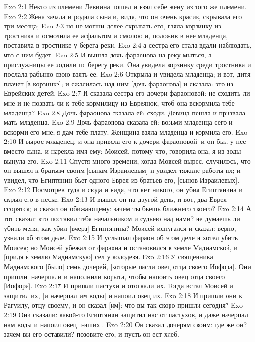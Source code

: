 \vs Exo 2:1 Некто из племени Левиина пошел и взял себе жену из того же племени.
\vs Exo 2:2 Жена зачала и родила сына и, видя, что он очень красив, скрывала его три месяца;
\vs Exo 2:3 но не могши долее скрывать его, взяла корзинку из тростника и осмолила ее асфальтом и смолою и, положив в нее младенца, поставила в тростнике у берега реки,
\vs Exo 2:4 а сестра его стала вдали наблюдать, что с ним будет.
\vs Exo 2:5 И вышла дочь фараонова на реку мыться, а прислужницы ее ходили по берегу реки. Она увидела корзинку среди тростника и послала рабыню свою взять ее.
\vs Exo 2:6 Открыла и увидела младенца; и вот, дитя плачет [в корзинке]; и сжалилась над ним [дочь фараонова] и сказала: это из Еврейских детей.
\vs Exo 2:7 И сказала сестра его дочери фараоновой: не сходить ли мне и не позвать ли к тебе кормилицу из Евреянок, чтоб она вскормила тебе младенца?
\vs Exo 2:8 Дочь фараонова сказала ей: сходи. Девица пошла и призвала мать младенца.
\vs Exo 2:9 Дочь фараонова сказала ей: возьми младенца сего и вскорми его мне; я дам тебе плату. Женщина взяла младенца и кормила его.
\vs Exo 2:10 И вырос младенец, и она привела его к дочери фараоновой, и он был у нее вместо сына, и нарекла имя ему: Моисей, потому что, говорила она, я из воды вынула его.
\rsbpar\vs Exo 2:11 Спустя много времени, когда Моисей вырос, случилось, что он вышел к братьям своим [сынам Израилевым] и увидел тяжкие работы их; и увидел, что Египтянин бьет одного Еврея из братьев его, [сынов Израилевых].
\vs Exo 2:12 Посмотрев туда и сюда и видя, что нет никого, он убил Египтянина и скрыл его в песке.
\vs Exo 2:13 И вышел он на другой день, и вот, два Еврея ссорятся; и сказал он обижающему: зачем ты бьешь ближнего твоего?
\vs Exo 2:14 А тот сказал: кто поставил тебя начальником и судьею над нами? не думаешь ли убить меня, как убил [вчера] Египтянина? Моисей испугался и сказал: верно, узнали об этом деле.
\vs Exo 2:15 И услышал фараон об этом деле и хотел убить Моисея; но Моисей убежал от фараона и остановился в земле Мадиамской, и [придя в землю Мадиамскую] сел у колодезя.
\vs Exo 2:16 У священника Мадиамского [было] семь дочерей, [которые пасли овец отца своего Иофора]. Они пришли, начерпали  и наполнили корыта, чтобы напоить овец отца своего [Иофора].
\vs Exo 2:17 И пришли пастухи и отогнали их. Тогда встал Моисей и защитил их, [и начерпал им воды] и напоил овец их.
\vs Exo 2:18 И пришли они к Рагуилу, отцу своему, и он сказал [им]: что вы так скоро пришли сегодня?
\vs Exo 2:19 Они сказали: какой-то Египтянин защитил нас от пастухов, и даже начерпал нам воды и напоил овец [наших].
\vs Exo 2:20 Он сказал дочерям своим: где же он? зачем вы его оставили? позовите его, и пусть он ест хлеб.
